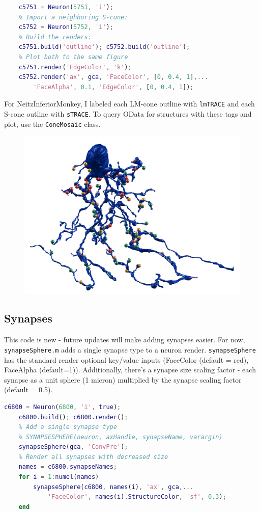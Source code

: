 \documentclass[12pt]{exam}
\begin{document}
	\begin{lstlisting}[language=matlab]
	% Import an L/M-cone:
	c5751 = Neuron(5751, 'i');
	% Import a neighboring S-cone:
	c5752 = Neuron(5752, 'i');
	% Build the renders:
	c5751.build('outline'); c5752.build('outline');
	% Plot both to the same figure
	c5751.render('EdgeColor', 'k');
	c5752.render('ax', gca, 'FaceColor', [0, 0.4, 1],...
		'FaceAlpha', 0.1, 'EdgeColor', [0, 0.4, 1]);\end{lstlisting}	
	For NeitzInferiorMonkey, I labeled each LM-cone outline with \texttt{lmTRACE} and each S-cone outline with \texttt{sTRACE}. To query OData for structures with these tags and plot, use the \texttt{ConeMosaic} class.	

		\begin{figure}
			\includegraphics[width=\linewidth]{c6800_synapses}
		\end{figure}
	\subsection{Synapses}
	This code is new - future updates will make adding synapses easier. For now, \texttt{synapseSphere.m} adds a single synapse type to a neuron render. \texttt{synapseSphere} has the standard render optional key/value inputs (FaceColor (default = red), FaceAlpha (default=1)). Additionally, there's a synapse size scaling factor - each synapse as a unit sphere (1 micron) multiplied by the synapse scaling factor (default = 0.5).
	\begin{lstlisting}[language=matlab]
	c6800 = Neuron(6800, 'i', true);
	c6800.build(); c6800.render();
	% Add a single synapse type
	% SYNAPSESPHERE(neuron, axHandle, synapseName, varargin)
	synapseSphere(gca, 'ConvPre');
	% Render all synapses with decreased size
	names = c6800.synapseNames;
	for i = 1:numel(names)
		synapseSphere(c6800, names(i), 'ax', gca,...
			'FaceColor', names(i).StructureColor, 'sf', 0.3);
	end\end{lstlisting}
\end{document}
